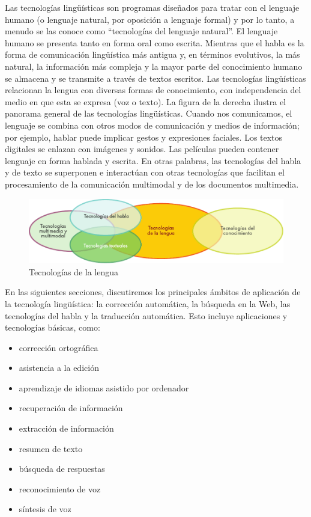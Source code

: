 \begin{multicols}{2}

Las tecnologías lingüísticas son programas diseñados para tratar con el lenguaje humano (o lenguaje natural, por oposición a lenguaje formal) y por lo tanto, a menudo se las conoce como ``tecnologías del lenguaje natural''. El lenguaje humano se presenta tanto en forma oral como escrita. Mientras que el habla es la forma de comunicación lingüística más antigua y, en términos evolutivos, la más natural, la información más compleja y la mayor parte del conocimiento humano se almacena y se transmite a través de textos escritos. Las tecnologías lingüísticas relacionan la lengua con diversas formas de conocimiento, con independencia del medio en que esta se expresa (voz o texto). La figura de la derecha ilustra el panorama general de las tecnologías lingüísticas. Cuando nos comunicamos, el lenguaje se combina con otros modos de comunicación y medios de información; por ejemplo, hablar puede implicar gestos y expresiones faciales. Los textos digitales se enlazan con imágenes y sonidos. Las películas pueden contener lenguaje en forma hablada y escrita. En otras palabras, las tecnologías del habla y de texto se superponen e interactúan con otras tecnologías que facilitan el procesamiento de la comunicación multimodal y de los documentos multimedia.

\begin{figure}[htb]
  \center
  \includegraphics[width=\textwidth]{../_media/spanish/language_technologies}
  \caption{Tecnologías de la lengua}
  \label{fig:ltincontext_de}
\end{figure}

En las siguientes secciones, discutiremos los principales ámbitos de aplicación de la tecnología lingüística: la corrección automática, la búsqueda en la Web, las tecnologías del habla y la traducción automática. Esto incluye aplicaciones y tecnologías básicas, como:
\columnbreak

\begin{itemize}
  \item	corrección ortográfica
  \item	asistencia a la edición
  \item	aprendizaje de idiomas asistido por ordenador
  \item	recuperación de información
  \item	extracción de información
  \item	resumen de texto
  \item	búsqueda de respuestas
  \item	reconocimiento de voz
  \item	síntesis de voz
\end{itemize}


\end{multicols}
